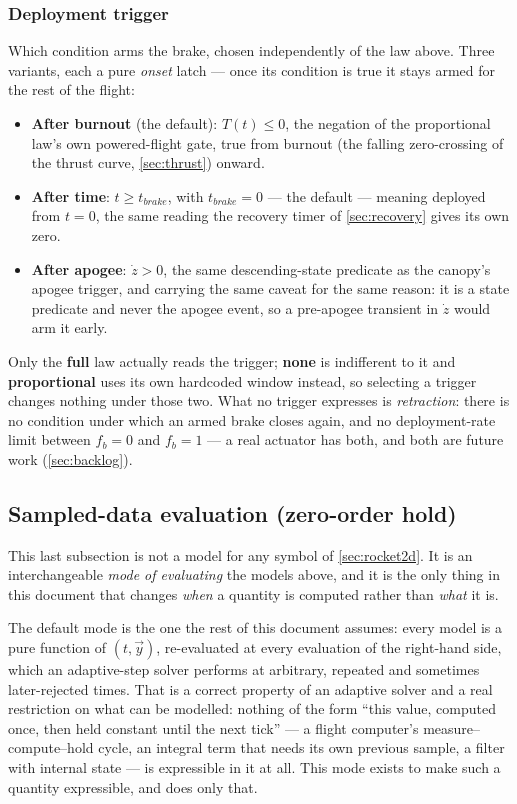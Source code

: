 \subsubsection{Deployment trigger}\label{sec:airbrake_trigger}
Which condition arms the brake, chosen independently of the law above. Three variants, each a pure
\emph{onset} latch --- once its condition is true it stays armed for the rest of the flight:
\begin{itemize}
    \item \textbf{After burnout} (the default): $T(t)\leq0$, the negation of the proportional law's
    own powered-flight gate, true from burnout (the falling zero-crossing of the thrust curve,
    \autoref{sec:thrust}) onward.
    \item \textbf{After time}: $t\geq t_{brake}$, with $t_{brake}=0$ --- the default --- meaning
    deployed from $t=0$, the same reading the recovery timer of \autoref{sec:recovery} gives its
    own zero.
    \item \textbf{After apogee}: $\dot{z}>0$, the same descending-state predicate as the canopy's
    apogee trigger, and carrying the same caveat for the same reason: it is a state predicate and
    never the apogee event, so a pre-apogee transient in $\dot{z}$ would arm it early.
\end{itemize}
Only the \textbf{full} law actually reads the trigger; \textbf{none} is indifferent to it and
\textbf{proportional} uses its own hardcoded window instead, so selecting a trigger changes nothing
under those two. What no trigger expresses is \emph{retraction}: there is no condition under which
an armed brake closes again, and no deployment-rate limit between $f_b=0$ and $f_b=1$ --- a real
actuator has both, and both are future work (\autoref{sec:backlog}).

\subsection{Sampled-data evaluation (zero-order hold)}\label{sec:sampled}
This last subsection is not a model for any symbol of \autoref{sec:rocket2d}. It is an
interchangeable \emph{mode of evaluating} the models above, and it is the only thing in this
document that changes \emph{when} a quantity is computed rather than \emph{what} it is.

The default mode is the one the rest of this document assumes: every model is a pure function of
$(t,\vec{y})$, re-evaluated at every evaluation of the right-hand side, which an adaptive-step
solver performs at arbitrary, repeated and sometimes later-rejected times. That is a correct
property of an adaptive solver and a real restriction on what can be modelled: nothing of the form
``this value, computed once, then held constant until the next tick'' --- a flight computer's
measure--compute--hold cycle, an integral term that needs its own previous sample, a filter with
internal state --- is expressible in it at all. This mode exists to make such a quantity
expressible, and does only that.

